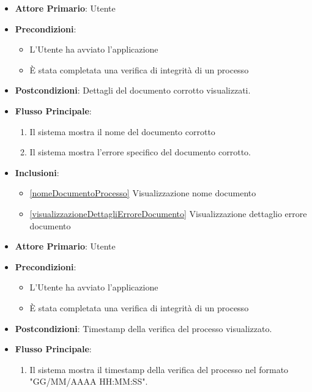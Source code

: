 \begin{itemize}
    \item \textbf{Attore Primario}: Utente
    \item \textbf{Precondizioni}: 
        \begin{itemize}
            \item L'Utente ha avviato l'applicazione
            \item È stata completata una verifica di integrità di un processo
        \end{itemize}
    \item \textbf{Postcondizioni}: Dettagli del documento corrotto visualizzati.
    \item \textbf{Flusso Principale}:
        \begin{enumerate}
            \item Il sistema mostra il nome del documento corrotto
            \item Il sistema mostra l'errore specifico del documento corrotto.
        \end{enumerate}
    \item \textbf{Inclusioni}: \begin{itemize}
        \item \ref{nomeDocumentoProcesso} Visualizzazione nome documento
        \item \ref{visualizzazioneDettagliErroreDocumento} Visualizzazione dettaglio errore documento
        \end{itemize}
\end{itemize}

\begin{itemize}
    \item \textbf{Attore Primario}: Utente
    \item \textbf{Precondizioni}: 
        \begin{itemize}
            \item L'Utente ha avviato l'applicazione
            \item È stata completata una verifica di integrità di un processo
            
        \end{itemize} 
    \item \textbf{Postcondizioni}: Timestamp della verifica del processo visualizzato.
    \item \textbf{Flusso Principale}:
        \begin{enumerate}
            \item Il sistema mostra il timestamp della verifica del processo nel formato "GG/MM/AAAA HH:MM:SS".
        \end{enumerate}
\end{itemize}

